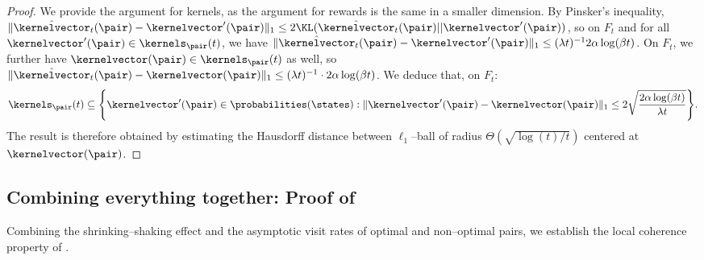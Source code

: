 \documentclass[preprint,cleveref,12pt]{colt2025}
\DeclarePairedDelimiter{\braces}{\{}{\}}	%
\DeclarePairedDelimiter{\norm}{\lVert}{\rVert}	%
\def\kernel{\kernelvector}
\begin{document}
    \begin{proof}
        We provide the argument for kernels, as the argument for rewards is the same in a smaller dimension.
        By Pinsker's inequality, $\norm{\hat{\kernel}_t(\pair) - \kernel'(\pair)}_1 \le 2 \KL(\hat{\kernel}_t(\pair)||\kernel'(\pair))$, so on $F_t$ and for all $\kernel'(\pair) \in \kernels_\pair (t)$, we have $\norm{\hat{\kernel}_t(\pair) - \kernel'(\pair)}_1 \le (\lambda t)^{-1} {2 \alpha \log(\beta t)}$. 
        On $F_t$, we further have $\kernel(\pair) \in \kernels_\pair (t)$ as well, so $\norm{\hat{\kernel}_t(\pair) - \kernel(\pair)}_1 \le (\lambda t)^{-1} \cdot 2 \alpha \log(\beta t)$.
        We deduce that, on $F_t$:
        \begin{equation}
        \notag
            \kernels_\pair (t) 
            \subseteq 
            \braces*{
                \kernel'(\pair) \in \probabilities(\states)
                :
                \norm{\kernel'(\pair) - \kernel(\pair)}_1 \le 2 \sqrt{\frac{2 \alpha \log(\beta t)}{\lambda t}}
            }
            .
        \end{equation}
        The result is therefore obtained by estimating the Hausdorff distance between $\ell_1$--ball of radius $\Theta(\sqrt{\log(t)/t})$ centered at $\kernel(\pair)$.  
    \end{proof}

    \subsection{Combining  everything together: Proof of }
    \label{appendix_local_coherence}

    Combining the shrinking--shaking effect and the asymptotic visit rates of optimal and non--optimal pairs, we establish the local coherence property of .
\end{document}

